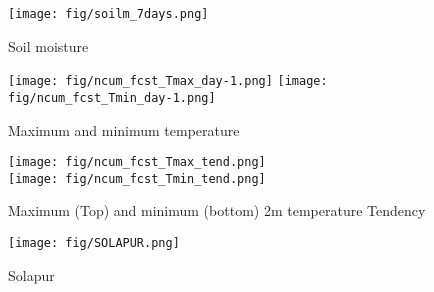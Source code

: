 \documentclass[10pt,a4paper]{article} %
\begin{document}
\begin{figure}[h!]
\centering
\texttt{[image: fig/soilm\_7days.png]}
\caption{Soil moisture}
\end{figure}





\begin{figure}[h!]
\centering
\texttt{[image: fig/ncum\_fcst\_Tmax\_day-1.png]}
\texttt{[image: fig/ncum\_fcst\_Tmin\_day-1.png]}
\caption{Maximum and minimum temperature}
\end{figure}


\begin{figure}[h!]
\centering
\texttt{[image: fig/ncum\_fcst\_Tmax\_tend.png]}\\
\vskip 0.5cm
\texttt{[image: fig/ncum\_fcst\_Tmin\_tend.png]}
\caption{Maximum (Top) and minimum (bottom) 2m temperature Tendency}
\end{figure}


\begin{figure}[h!]
\centering
\texttt{[image: fig/SOLAPUR.png]}\\
\caption{Solapur}
\end{figure}

\end{document}
